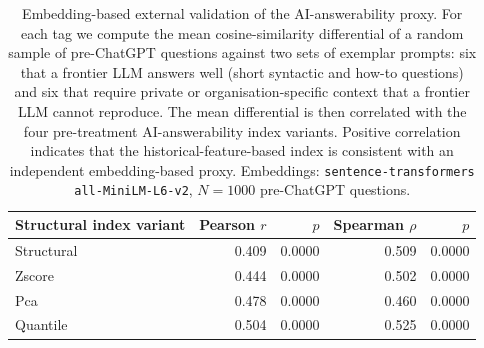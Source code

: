 \begin{table}[ht]
\centering
\caption{Embedding-based external validation of the AI-answerability proxy. For each tag we compute the mean cosine-similarity differential of a random sample of pre-ChatGPT questions against two sets of exemplar prompts: six that a frontier LLM answers well (short syntactic and how-to questions) and six that require private or organisation-specific context that a frontier LLM cannot reproduce. The mean differential is then correlated with the four pre-treatment AI-answerability index variants. Positive correlation indicates that the historical-feature-based index is consistent with an independent embedding-based proxy. Embeddings: \texttt{sentence-transformers all-MiniLM-L6-v2}, $N = 1000$ pre-ChatGPT questions.}
\label{tab:embedding_validation}
\small
\begin{tabular}{lrrrr}
\toprule
Structural index variant & Pearson $r$ & $p$ & Spearman $\rho$ & $p$ \\
\midrule
Structural & 0.409 & 0.0000 & 0.509 & 0.0000 \\
Zscore & 0.444 & 0.0000 & 0.502 & 0.0000 \\
Pca & 0.478 & 0.0000 & 0.460 & 0.0000 \\
Quantile & 0.504 & 0.0000 & 0.525 & 0.0000 \\
\bottomrule
\end{tabular}
\end{table}